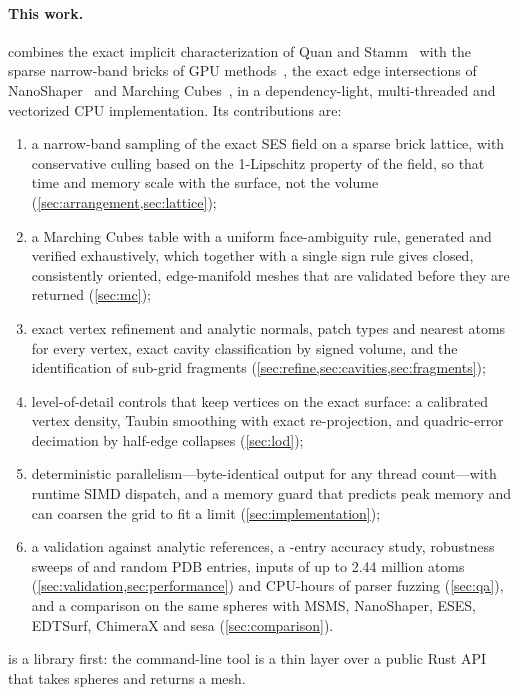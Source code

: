 \paragraph{This work.}
\sesmesh{} combines the exact implicit characterization of Quan and
Stamm~\cite{quan2016} with the sparse narrow-band bricks of GPU
methods~\cite{hermosilla2017,museth2013}, the exact edge intersections of
NanoShaper~\cite{decherchi2013} and Marching Cubes~\cite{lorensen1987}, in a
dependency-light, multi-threaded and vectorized CPU implementation. Its
contributions are:
\begin{enumerate}
  \item a narrow-band sampling of the exact SES field on a sparse brick
    lattice, with conservative culling based on the 1-Lipschitz property of
    the field, so that time and memory scale with the surface, not the
    volume (\cref{sec:arrangement,sec:lattice});
  \item a Marching Cubes table with a uniform face-ambiguity rule, generated
    and verified exhaustively, which together with a single sign rule gives
    closed, consistently oriented, edge-manifold meshes that are validated
    before they are returned (\cref{sec:mc});
  \item exact vertex refinement and analytic normals, patch types and
    nearest atoms for every vertex, exact cavity classification by signed
    volume, and the identification of sub-grid fragments
    (\cref{sec:refine,sec:cavities,sec:fragments});
  \item level-of-detail controls that keep vertices on the exact surface:
    a calibrated vertex density, Taubin smoothing with exact re-projection,
    and quadric-error decimation by half-edge collapses (\cref{sec:lod});
  \item deterministic parallelism---byte-identical output for any thread
    count---with runtime SIMD dispatch, and a memory guard that predicts
    peak memory and can coarsen the grid to fit a limit
    (\cref{sec:implementation});
  \item a validation against analytic references, a -entry
    accuracy study, robustness sweeps of  and  random
    PDB entries, inputs of up to 2.44 million atoms
    (\cref{sec:validation,sec:performance}) and 
    CPU-hours of parser fuzzing (\cref{sec:qa}), and a
    comparison on the same spheres with MSMS, NanoShaper, ESES, EDTSurf,
    ChimeraX and sesa (\cref{sec:comparison}).
\end{enumerate}
\sesmesh{} is a library first: the command-line tool is a thin layer over
a public Rust API that takes spheres and returns a mesh.

